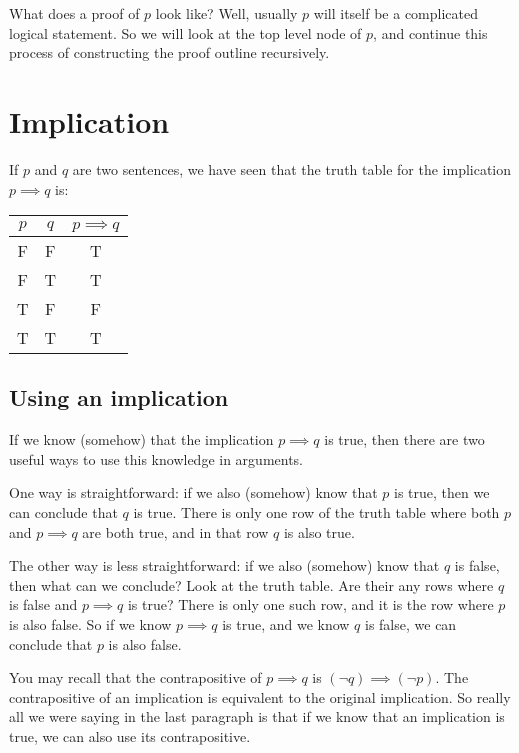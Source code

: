 What does a proof of $p$ look like?  Well, usually $p$ will itself be a complicated logical statement.  So we will look at the top level node of $p$, and continue this process of constructing the proof outline recursively.

\newpage

\section{Implication}

If $p$ and $q$ are two sentences, we have seen that the truth table for the implication $p \implies q$ is:

\begin{table}[h]
	\centering
	\begin{tabular}{c|c|c}
		$p$ & $q$ & $p \implies q$ 	\\ \hline
		F & F & T 	\\ \hline
		F & T & T 	\\ \hline
		T & F & F 	\\ \hline
		T &  T & T 	\\ \hline
	\end{tabular}
\end{table}

\subsection{Using an implication}

If we know (somehow) that the implication $p \implies q$ is true, then there are two useful ways to use this knowledge in arguments.

One way is straightforward:  if we also (somehow) know that $p$ is true, then we can conclude that $q$ is true.  There is only one row of the truth table where both $p$ and $p \implies q$ are both true, and in that row $q$ is also true.

The other way is less straightforward:  if we also (somehow) know that $q$ is false, then what can we conclude?  Look at the truth table.  Are their any rows where $q$ is false and $p \implies q$ is true?  There is only one such row, and it is the row where $p$ is also false.  So if we know $p \implies q$ is true, and we know $q$ is false,  we can conclude that $p$ is also false. 

You may recall that the contrapositive of $p \implies q$ is $(\neg q) \implies (\neg p)$.  The contrapositive of an implication is equivalent to the original implication.  So really all we were saying in the last paragraph is that if we know that an implication is true, we can also use its contrapositive.

